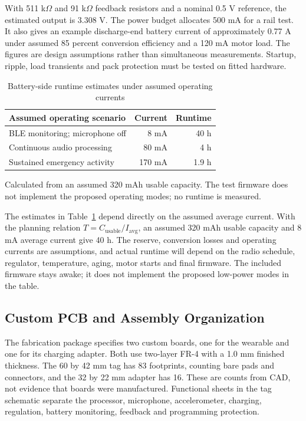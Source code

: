 \documentclass[nolineno]{ieeeaccess}
\begin{document}
With 511 k\(\Omega\) and 91 k\(\Omega\) feedback resistors and a nominal 0.5 V reference, the estimated output is 3.308 V. The power budget allocates 500 mA for a rail test. It also gives an example discharge-end battery current of approximately 0.77 A under assumed 85 percent conversion efficiency and a 120 mA motor load. The figures are design assumptions rather than simultaneous measurements. Startup, ripple, load transients and pack protection must be tested on fitted hardware.

\begin{table}[t]
\caption{Battery-side runtime estimates under assumed operating currents}
\label{tab:runtime}
\centering
\begin{tabular}{lrr}
\toprule
Assumed operating scenario & Current & Runtime \\
\midrule
BLE monitoring; microphone off & 8 mA & 40 h \\
Continuous audio processing & 80 mA & 4 h \\
Sustained emergency activity & 170 mA & 1.9 h \\
\bottomrule
\end{tabular}
\par\smallskip\footnotesize Calculated from an assumed 320 mAh usable capacity. The test firmware does not implement the proposed operating modes; no runtime is measured.
\end{table}

The estimates in Table~\ref{tab:runtime} depend directly on the assumed average current. With the planning relation \(T=C_{\mathrm{usable}}/I_{\mathrm{avg}}\), an assumed 320 mAh usable capacity and 8 mA average current give 40 h. The reserve, conversion losses and operating currents are assumptions, and actual runtime will depend on the radio schedule, regulator, temperature, aging, motor starts and final firmware. The included firmware stays awake; it does not implement the proposed low-power modes in the table.


\subsection{Custom PCB and Assembly Organization}
The fabrication package specifies two custom boards, one for the wearable and one for its charging adapter. Both use two-layer FR-4 with a 1.0 mm finished thickness. The 60 by 42 mm tag has 83 footprints, counting bare pads and connectors, and the 32 by 22 mm adapter has 16. These are counts from CAD, not evidence that boards were manufactured. Functional sheets in the tag schematic separate the processor, microphone, accelerometer, charging, regulation, battery monitoring, feedback and programming protection.
\end{document}
